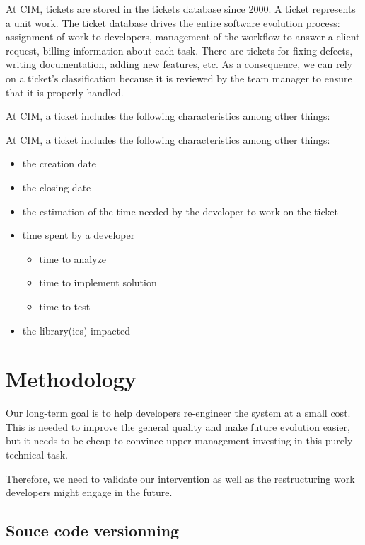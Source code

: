 \documentclass[10pt,conference]{IEEEtran}
\begin{document}
At CIM, tickets are stored in the tickets database since 2000.
A ticket represents a unit work.
The ticket database drives the entire software evolution process: assignment of work to developers, management of the workflow to answer a client request, billing information about each task.
There are tickets for fixing defects, writing documentation, adding new features, etc. 
As a consequence, we can rely on a ticket's classification because it is reviewed by the team manager to ensure that it is properly handled.

At CIM, a ticket includes the following characteristics among other things:


At CIM, a ticket includes the following characteristics among other things:

\begin{itemize}
\item the creation date
\item the closing date
\item the estimation of the time needed by the developer to work on the ticket
\item time spent by a developer
  \begin{itemize}
  \item time to analyze
  \item time to implement solution
  \item time to test
  \end{itemize}
  \item the library(ies) impacted
\end{itemize}

\section{Methodology}
\label{sec:methodology}


Our long-term goal is to help developers re-engineer the system at a small cost.
This is needed to improve the general quality and make future evolution easier, but it needs to be cheap to convince upper management investing in this purely technical task.

Therefore, we need to validate our intervention as well as the restructuring work developers might engage in the future.

\subsection{Souce code versionning}
\end{document}
